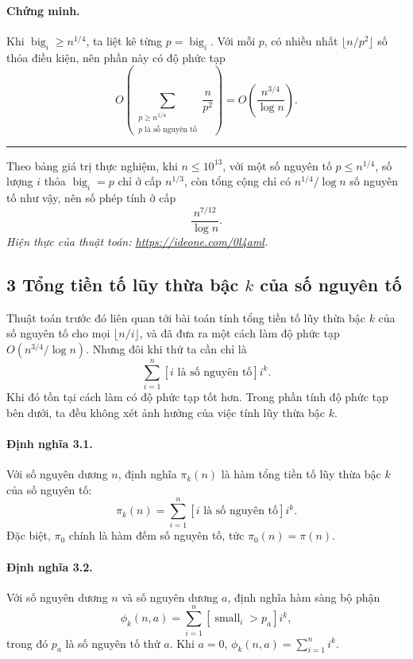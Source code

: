 \documentclass[11pt]{article}
\newcommand{\qedmark}{\hfill\rule{0.7ex}{0.7ex}}
\begin{document}
\paragraph{Chứng minh.}
Khi \(\operatorname{big}_i\ge n^{1/4}\), ta liệt kê từng
\(p=\operatorname{big}_i\). Với mỗi \(p\), có nhiều nhất \(\lfloor n/p^2\rfloor\)
số thỏa điều kiện, nên phần này có độ phức tạp
\[
  O\left(\sum_{\substack{p\ge n^{1/4}\\p\text{ là số nguyên tố}}}\frac{n}{p^2}\right)
  =O\left(\frac{n^{3/4}}{\log n}\right).
\]
\qedmark

Theo bảng giá trị thực nghiệm, khi \(n\le 10^{13}\), với một số nguyên tố
\(p\le n^{1/4}\), số lượng \(i\) thỏa \(\operatorname{big}_i=p\) chỉ ở cấp
\(n^{1/3}\), còn tổng cộng chỉ có \(n^{1/4}/\log n\) số nguyên tố như vậy, nên
số phép tính ở cấp
\[
  \frac{n^{7/12}}{\log n}.
\]
\emph{Hiện thực của thuật toán: \url{https://ideone.com/0l4aml}.}

\subsection*{3 Tổng tiền tố lũy thừa bậc \(k\) của số nguyên tố}

Thuật toán trước đó liên quan tới bài toán tính tổng tiền tố lũy thừa bậc
\(k\) của số nguyên tố cho mọi \(\lfloor n/i\rfloor\), và đã đưa ra một cách
làm độ phức tạp \(O(n^{3/4}/\log n)\). Nhưng đôi khi thứ ta cần chỉ là
\[
  \sum_{i=1}^{n}[i\text{ là số nguyên tố}]i^k.
\]
Khi đó tồn tại cách làm có độ phức tạp tốt hơn. Trong phần tính độ phức tạp bên
dưới, ta đều không xét ảnh hưởng của việc tính lũy thừa bậc \(k\).

\paragraph{Định nghĩa 3.1.}
Với số nguyên dương \(n\), định nghĩa \(\pi_k(n)\) là hàm tổng tiền tố lũy thừa
bậc \(k\) của số nguyên tố:
\[
  \pi_k(n)=\sum_{i=1}^{n}[i\text{ là số nguyên tố}]i^k.
\]
Đặc biệt, \(\pi_0\) chính là hàm đếm số nguyên tố, tức \(\pi_0(n)=\pi(n)\).

\paragraph{Định nghĩa 3.2.}
Với số nguyên dương \(n\) và số nguyên dương \(a\), định nghĩa hàm sàng bộ phận
\[
  \phi_k(n,a)=\sum_{i=1}^{n}[\operatorname{small}_i>p_a]i^k,
\]
trong đó \(p_a\) là số nguyên tố thứ \(a\). Khi \(a=0\),
\(\phi_k(n,a)=\sum_{i=1}^n i^k\).
\end{document}

